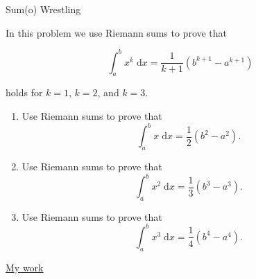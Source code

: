\documentclass[12pt]{article}
\begin{document}
\newpage

\begin{center}

{\Large Sum(o) Wrestling} 

\end{center}

\vspace*{.2in}


\noindent In this problem we use Riemann sums to prove that

$$\int_{a}^b x^k \; \mathrm{d}x = \frac{1}{k+1}(b^{k+1}-a^{k+1})$$

holds for $k=1$, $k=2$, and $k=3$.

\begin{enumerate}

\item Use Riemann sums to prove that $$\int_{a}^b x \; \mathrm{d}x = \frac{1}{2}(b^{2}-a^{2}).$$

\item Use Riemann sums to prove that $$\int_{a}^b x^2 \; \mathrm{d}x = \frac{1}{3}(b^{3}-a^{3}).$$

\item Use Riemann sums to prove that $$\int_{a}^b x^3 \; \mathrm{d}x = \frac{1}{4}(b^{4}-a^{4}).$$

\end{enumerate}

\vspace*{.2in}

\newpage

\begin{center}
\underline {\Large {My work} }
\end{center}
\end{document}
